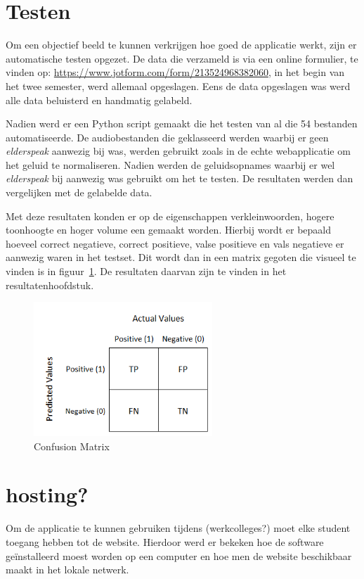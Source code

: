 \section{Testen}
Om een objectief beeld te kunnen verkrijgen hoe goed de applicatie werkt, zijn er automatische testen opgezet. De data die verzameld is via een online formulier, te vinden op:  \url{https://www.jotform.com/form/213524968382060}, in het begin van het twee semester, werd allemaal opgeslagen. Eens de data opgeslagen was werd alle data beluisterd en handmatig gelabeld.

Nadien werd er een Python script gemaakt die het testen van al die 54 bestanden automatiseerde. De audiobestanden die geklasseerd werden waarbij er geen \textit{elderspeak} aanwezig bij was, werden gebruikt zoals in de echte webapplicatie om het geluid te normaliseren. Nadien werden de geluidsopnames waarbij er wel \textit{elderspeak} bij aanwezig was gebruikt om het te testen. De resultaten werden dan vergelijken met de gelabelde data.

Met deze resultaten konden er op de eigenschappen verkleinwoorden, hogere toonhoogte en hoger volume een  gemaakt worden. Hierbij wordt er bepaald hoeveel correct negatieve, correct positieve, valse positieve en vals negatieve er aanwezig waren in het testset. Dit wordt dan in een matrix gegoten die visueel te vinden is in figuur~\ref{fig:confusion_matrix}. De resultaten daarvan zijn te vinden in het resultatenhoofdstuk.

\begin{figure}
    \centering
    \includegraphics[width=0.6\textwidth]{./img/confusion_matrix.png}
    \caption{\label{fig:confusion_matrix} Confusion Matrix~\autocite{Jain2020}}
\end{figure}

\section{hosting?}
Om de applicatie te kunnen gebruiken tijdens (werkcolleges?) moet elke student toegang hebben tot de website. Hierdoor werd er bekeken hoe de software geïnstalleerd moest worden op een computer en hoe men de website beschikbaar maakt in het lokale netwerk.